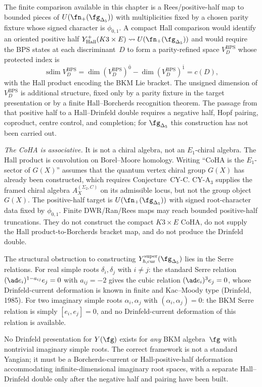 \begin{remark}
\label{rem:bkm-yangian-coha}
The finite comparison available in this chapter is a Rees/positive-half
map to bounded pieces of $U(\fn_+(\fg_{\Delta_5}))$ with multiplicities
fixed by a chosen parity fixture whose signed character is
\(\phi_{0,1}\). A compact Hall comparison would identify an
oriented positive half
$Y^+_{\mathrm{Hall}}(K3\times E)\rightsquigarrow
U(\fn_+(\fg_{\Delta_5}))$ and would require the BPS states at each
discriminant~$D$ to form a parity-refined space
$V^{\mathrm{BPS}}_D$ whose protected index is
\[
 \operatorname{sdim} V^{\mathrm{BPS}}_D
 = \dim (V^{\mathrm{BPS}}_D)^{\bar 0}
   - \dim (V^{\mathrm{BPS}}_D)^{\bar 1}
 = c(D),
\]
with the Hall product encoding the BKM Lie bracket. The unsigned
dimension of $V^{\mathrm{BPS}}_D$ is additional structure, fixed only by
a parity fixture in the target presentation or by a finite
Hall--Borcherds recognition theorem. The passage from that positive
half to a Hall--Drinfeld double requires a negative half, Hopf pairing,
coproduct, centre control, and completion; for $\fg_{\Delta_5}$ this
construction has not been carried out.

\emph{The CoHA is associative.} It is not a chiral algebra, not an
$E_1$-chiral algebra. The Hall product is convolution on
Borel--Moore homology. Writing ``$\mathrm{CoHA}$ is the $E_1$-sector
of $G(X)$'' assumes that the quantum vertex chiral group $G(X)$ has
already been constructed, which requires Conjecture~CY-C. CY-A$_3$
supplies the framed chiral algebra \(A_X^{(\Sigma_2,C)}\) on its
admissible locus, but not the group object $G(X)$. The positive-half
target is $U(\fn_+(\fg_{\Delta_5}))$ with signed root-character data
fixed by $\phi_{0,1}$. Finite DWR/Ran/Rees maps may reach bounded
positive-half truncations. They do not construct the compact
$K3\times E$ CoHA, do not supply the Hall product-to-Borcherds bracket
map, and do not produce the Drinfeld double.
\end{remark}

\begin{remark}
\label{rem:borcherds-serre-obstruction}
The structural obstruction to constructing
$Y_{\hbar,\mathrm{cur}}^{\mathrm{super}}(\fg_{\Delta_5})$ lies in the
Serre relations. For real simple roots $\delta_i, \delta_j$ with
$i \neq j$: the standard Serre relation
$(\ad e_i)^{1 - a_{ij}} e_j = 0$ with $a_{ij} = -2$ gives the cubic
relation $(\ad e_i)^3 e_j = 0$, whose Drinfeld-current deformation is
known in finite and Kac--Moody type (Drinfeld, 1985). For two
imaginary simple roots $\alpha_i, \alpha_j$ with
$(\alpha_i, \alpha_j) = 0$: the BKM Serre relation is simply
$[e_i, e_j] = 0$, and no Drinfeld-current deformation of this relation
is available.

No Drinfeld presentation for $Y(\fg)$ exists for \emph{any} BKM algebra~$\fg$ with nontrivial imaginary simple roots. The correct framework is not a standard Yangian; it must be a Borcherds-current or Hall-positive-half deformation accommodating infinite-dimensional imaginary root spaces, with a separate Hall--Drinfeld double only after the negative half and pairing have been built.
\end{remark}

